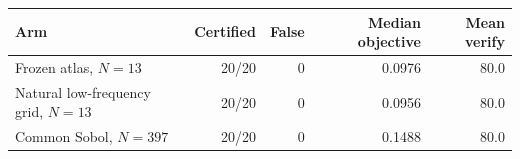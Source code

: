 \begin{tabular}{lrrrr}
\toprule
Arm & Certified & False & Median objective & Mean verify \\
\midrule
Frozen atlas, $N=13$ & 20/20 & 0 & 0.0976 & 80.0 \\
Natural low-frequency grid, $N=13$ & 20/20 & 0 & 0.0956 & 80.0 \\
Common Sobol, $N=397$ & 20/20 & 0 & 0.1488 & 80.0 \\
\bottomrule
\end{tabular}
